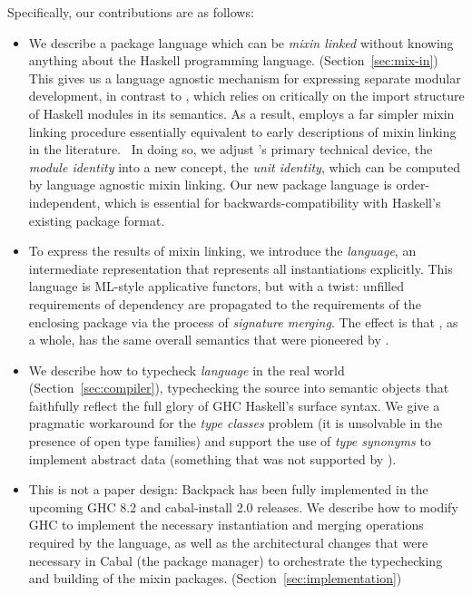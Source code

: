 Specifically, our contributions are as follows:
\begin{itemize}

    \item We describe a package language which can be \emph{mixin
    linked} without knowing anything about the Haskell programming
    language. (Section~\ref{sec:mix-in})  This gives us a language agnostic mechanism for
    expressing separate modular development, in contrast to
    \OldBackpack{}, which relies on critically on the import structure
    of Haskell modules in its semantics.  As a result, \Backpack{}
    employs a far simpler mixin linking procedure essentially equivalent
    to early descriptions of mixin linking in the literature.~\cite{cardelli:linksets}
    In doing so, we adjust \OldBackpack{}'s primary technical device,
    the \emph{module identity} into a new concept, the \emph{unit identity},
    which can be computed by language agnostic mixin linking.
    Our new package language is order-independent, which is
    essential for backwards-compatibility with Haskell's existing
    package format.

    \item To express the results of mixin linking, we introduce the
    \emph{\unit{} language}, an intermediate representation that
    represents all instantiations explicitly.  This language is
    ML-style applicative functors, but with a twist:
    unfilled requirements of dependency are propagated to the requirements
    of the enclosing package via the process of \emph{signature merging}.
    The effect is that \Backpack{}, as a whole, has the same overall
    semantics that were pioneered by \OldBackpack{}.

    \item We describe how to typecheck \emph{\unit{} language} in the
    real world (Section~\ref{sec:compiler}), typechecking the source into semantic objects that
    faithfully reflect the full glory of GHC Haskell's surface syntax.
    We give a pragmatic workaround for the \emph{type classes} problem
    (it is unsolvable in the presence of open type families) and support
    the use of \emph{type synonyms} to implement abstract data
    (something that was not supported by \OldBackpack{}).

    \item This is not a paper design: Backpack has been fully
    implemented in the upcoming GHC 8.2 and cabal-install 2.0 releases.
    We describe how to modify GHC to
    implement the necessary instantiation and merging operations
    required by the \unit{} language, as well as the architectural
    changes that were necessary in Cabal (the package manager)
    to orchestrate the typechecking and building of the mixin
    packages. (Section~\ref{sec:implementation})


\end{itemize}
